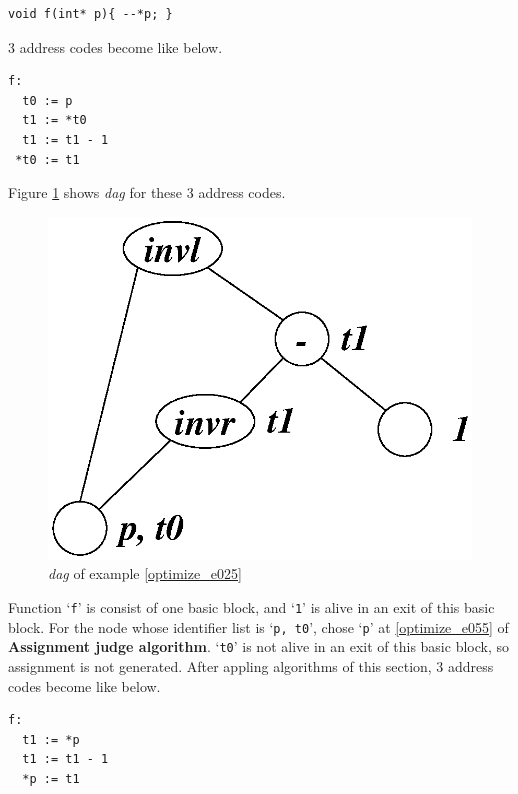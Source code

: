 \begin{Example}
\label{optimize_e025}
\begin{verbatim}
void f(int* p){ --*p; }
\end{verbatim}
3 address codes become like below.
\begin{verbatim}
f:
  t0 := p
  t1 := *t0
  t1 := t1 - 1
 *t0 := t1
\end{verbatim}
Figure \ref{optimize_e026} shows {\em dag} for these 3 address codes.
\begin{figure}[htbp]
\begin{center}
\includegraphics[width=0.7\linewidth,height=0.552\linewidth]{opt011.eps}
\caption{{\em dag} of example \ref{optimize_e025}}
\label{optimize_e026}
\end{center}
\end{figure}
Function `{\tt{f}}' is consist of one basic block, and 
`{\tt{1}}' is alive in an exit of this basic block.
For the node whose identifier list is `{\tt{p, t0}}',
chose `{\tt{p}}' at \ref{optimize_e055} of {\bf Assignment judge
 algorithm}.
`{\tt{t0}}' is not alive in an exit of this basic block, so
assignment is not generated.
After appling algorithms of this section,
3 address codes become like below.
\begin{verbatim}
f:
  t1 := *p
  t1 := t1 - 1
  *p := t1
\end{verbatim}
\end{Example}

